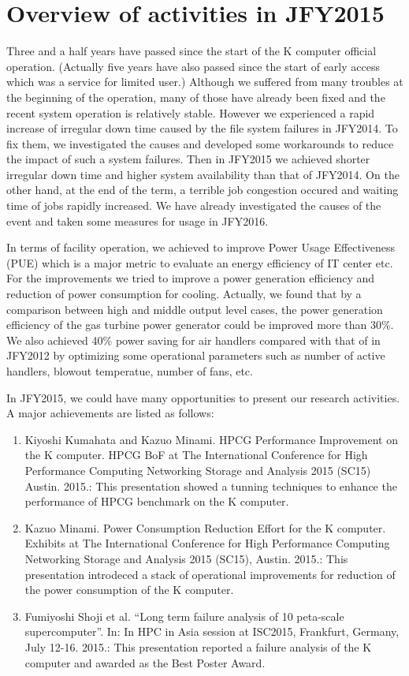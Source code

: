 \section*{Overview of activities in JFY2015}
Three and a half years have passed since the start of the K computer official operation.
(Actually five years have also passed since the start of early access which was a service for limited user.)
Although we suffered from many troubles at the beginning of the operation, many of those have already been fixed
and the recent system operation is relatively stable.
However we experienced a rapid increase of irregular down time caused by the file system failures in JFY2014.
To fix them,  we investigated the causes and developed some workarounds to reduce the impact of
such a system failures.
Then in JFY2015 we achieved shorter irregular down time and higher system availability than that of JFY2014.
On the other hand, at the end of the term, a terrible job congestion occured and waiting time of jobs rapidly increased.
We have already investigated the causes of the event and taken some measures for usage in JFY2016.

In terms of facility operation, we achieved to improve Power Usage Effectiveness (PUE)
which is a major metric to evaluate an energy efficiency of IT center etc.
For the improvements we tried to improve a power generation efficiency and reduction of power consumption for cooling.
Actually, we found that by a comparison between high and middle output level cases, the power generation efficiency of
the gas turbine power generator could be improved more than 30\%.
We also achieved 40\% power saving for air handlers compared with that of in JFY2012 by optimizing some operational
parameters such as number of active handlers, blowout temperatue, number of fans, etc.

In JFY2015, we could have many opportunities to present our research activities.
A major achievements are listed as follows:
\begin{enumerate}
\item Kiyoshi Kumahata and Kazuo Minami. HPCG Performance Improvement on the K computer. HPCG BoF at The International Conference for High Performance Computing Networking Storage and Analysis 2015 (SC15) Austin. 2015.:
This presentation showed a tunning techniques to enhance the performance of HPCG benchmark on the K computer.
\item Kazuo Minami. Power Consumption Reduction Effort for the K computer. Exhibits at The International Conference for High Performance Computing Networking Storage and Analysis 2015 (SC15), Austin. 2015.:
This presentation introdeced a stack of operational improvements for reduction of the power consumption of the K computer.
\item Fumiyoshi Shoji et al. “Long term failure analysis of 10 peta-scale supercomputer”. In: In HPC in Asia session at ISC2015, Frankfurt, Germany, July 12-16. 2015.:
This presentation reported a failure analysis of the K computer and awarded as the Best Poster Award.
\end{enumerate}
